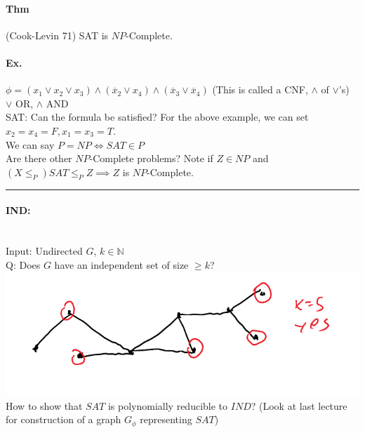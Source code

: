 \documentclass[12 pt]{article}
\begin{document}
          \paragraph{Thm} (Cook-Levin 71) SAT is $NP$-Complete.
          \paragraph{Ex.} $\phi = (x_1 \lor x_2 \lor x_3)\land
          (\overline{x}_2 \lor x_4) \land (\overline{x}_3 \lor
          \overline{x}_4)$ (This is called a CNF, $\land$ of $\lor$'s)
          \\ $\lor$ OR, $\land$ AND
          \\ SAT: Can the formula be satisfied? For the above example,
          we can set $x_2=x_4 = F, x_1 = x_3 = T$.
          \\ We can say $P = NP \iff SAT\in P$
          \\ Are there other $NP$-Complete problems? Note if $Z \in
          NP$ and $(X \leq_P )SAT \leq_P Z \implies Z$ is
          $NP$-Complete.
          \\ \noindent \rule{\textwidth}{0.5pt}
          \paragraph{IND:}~
          \\ Input: Undirected $G$, $k\in \mathbb{N}$
          \\ Q: Does $G$ have an independent set of size $\geq k$?
          \\ \includegraphics[width=.9\textwidth]{i128.pdf}
          \\ How to show that $SAT$ is polynomially reducible to
          $IND$? (Look at last lecture for construction of a graph $G_{\phi}$
          representing $SAT$)
\end{document}
